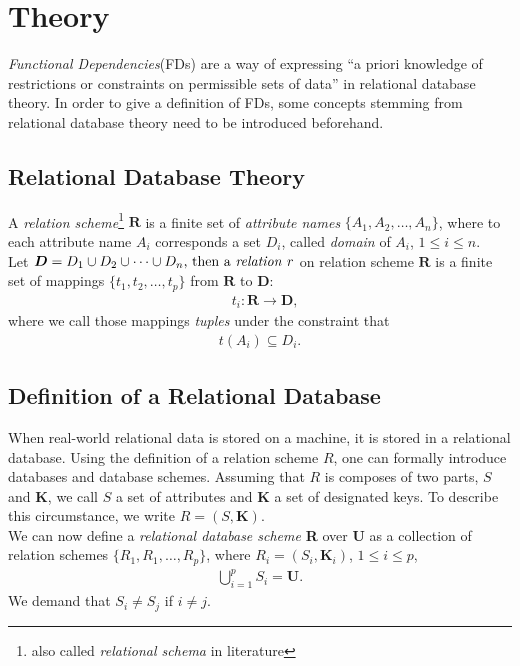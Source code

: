 \newpage
\section{Theory}
\emph{Functional Dependencies}(FDs) are a way of expressing ``a priori knowledge of restrictions or constraints on permissible sets of data''\cite[p.42]{MAI83} in relational database theory.
In order to give a definition of FDs, some concepts stemming from relational database theory need to be introduced beforehand.

\subsection{Relational Database Theory}
A \emph{relation scheme}\footnote{also called \emph{relational schema} in literature\cite[p.21]{ABE19} } \(\boldsymbol{R}\) is a finite set of \emph{attribute names} \(\{A_1, A_2, \dots, A_n\}\), where to each attribute name \(A_i\) corresponds a set \(D_i\), called \emph{domain} of \(A_i\), \(1 \leq i \leq n\). \\

Let \(\boldsymbol{D} = D_1 \cup D_2 \cup \dots \cup D_n$, then a \emph{relation} \(r\) on relation scheme \(\boldsymbol{R}\) is a finite set of mappings \(\{t_1, t_2, \dots, t_p\}\) from \(\boldsymbol{R}\) to \(\boldsymbol{D}\):
\begin{align*}
  &t_i: \boldsymbol{R} \to \boldsymbol{D},
\end{align*}
where we call those mappings \emph{tuples} under the constraint that \cite[p.2]{MAI83}
\begin{align*}
    t(A_i) \subseteq D_i.
\end{align*}

\subsection{Definition of a Relational Database}
When real-world relational data is stored on a machine, it is stored in a relational database.
Using the definition of a relation scheme \(R\), one can formally introduce databases and database schemes.
Assuming that \(R\) is composes of two parts, \(S\) and \(\boldsymbol{K}\), we call \(S\) a set of attributes and \(\boldsymbol{K}\) a set of designated keys. To describe this circumstance, we write \(R = (S, \boldsymbol{K})\). \\

We can now define a \emph{relational database scheme} \textbf{R} over \textbf{U} as a collection of relation schemes \(\{R_1, R_1, \dots, R_p\}\), where \(R_i = (S_i, \boldsymbol{K}_i)\), \(1 \leq i \leq p\),
\begin{align*}
    \bigcup^{p}_{i=1} S_i = \boldsymbol{U}.
\end{align*}
We demand that \(S_i \neq S_j\) if \(i \neq j\). \\

